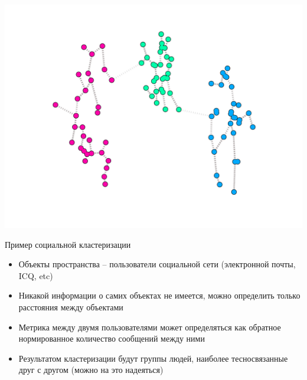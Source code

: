 \documentclass[compress,unicode]{beamer}
\begin{document}
\begin{frame}{}
\includegraphics[width=\textwidth]{spanning-tree-clustering}
\end{frame}

\begin{frame}{}
\begin{block}{}
\scriptsize

\end{block}
\end{frame}



\begin{frame}{Пример социальной кластеризации}
\begin{itemize}
	\item Объекты пространства -- пользователи социальной сети (электронной почты, ICQ, etc)
	\item Никакой информации о самих объектах не имеется, можно определить только расстояния между объектами
	\item Метрика между двумя пользователями может определяться как обратное нормированное количество сообщений между ними
	\item Результатом кластеризации будут группы людей, наиболее тесносвязанные друг с другом (можно на это надеяться)
\end{itemize}
\end{frame}
\end{document}
